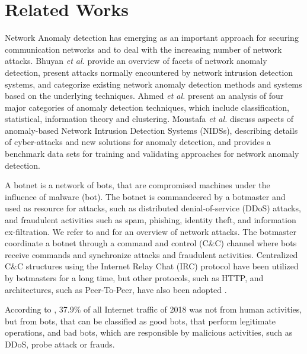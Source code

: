 \section{Related Works}
\label{sec:3_relatedworks}

Network Anomaly detection has emerging as an important approach for securing communication networks and to deal with the increasing number of network attacks. Bhuyan \emph{et al.} \cite{bhuyan2014network} provide an overview of facets of network anomaly detection, present attacks normally encountered by network intrusion detection systems, and categorize existing network anomaly detection methods and systems based on the underlying techniques. Ahmed \emph{et al.} \cite{ahmed2016survey} present an analysis of four major categories of anomaly detection techniques, which include classification, statistical, information theory and clustering. Moustafa \emph{et al.} \cite{moustafa2019holistic} discuss aspects of anomaly-based Network Intrusion Detection Systems (NIDSs), describing details of cyber-attacks and new solutions for anomaly detection, and provides a benchmark data sets for training and validating approaches for network anomaly detection.

A botnet is a network of bots, that are compromised machines under the influence of malware (bot). The botnet is commandeered by a botmaster and used as resource for attacks, such as distributed denial-of-service (DDoS) attacks, and fraudulent activities such as spam, phishing, identity theft, and information ex-filtration. We refer to \cite{ahmed2016survey} and \cite{moustafa2019holistic} for an overview of network attacks. The botmaster coordinate a botnet through a command and control (C\&C) channel where bots receive commands and synchronize attacks and fraudulent activities. Centralized C\&C structures using the Internet Relay Chat (IRC) protocol have been utilized by botmasters for a long time, but other protocols, such as HTTP, and architectures, such as Peer-To-Peer, have also been adopted \cite{gu2008botminer}.

According to \cite{distilnetworks2019}, 37.9\% of all Internet traffic of 2018 was not from human activities, but from bots, that can be classified as good bots, that perform legitimate operations, and bad bots, which are responsible by malicious activities, such as DDoS, probe attack or frauds.

